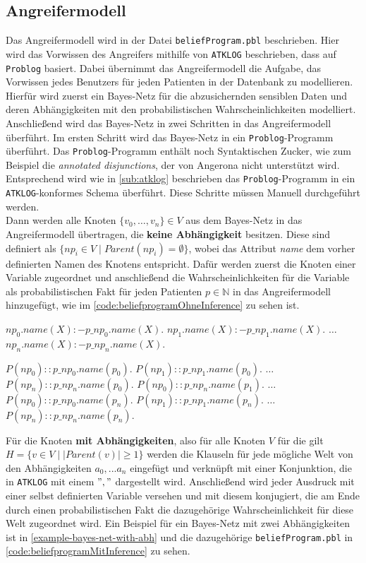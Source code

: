 \documentclass[german,version-2020-11]{uzl-thesis}
\begin{document}
\subsection{Angreifermodell} \label{2.2.1}
Das Angreifermodell wird in der Datei \texttt{beliefProgram.pbl} beschrieben. Hier wird das Vorwissen des Angreifers mithilfe von \texttt{ATKLOG} beschrieben, dass auf \texttt{Problog} basiert. Dabei übernimmt das Angreifermodell die Aufgabe, das Vorwissen jedes Benutzers für jeden Patienten in der Datenbank zu modellieren. \\ 
Hierfür wird zuerst ein Bayes-Netz für die abzusichernden sensiblen Daten und deren Abhängigkeiten mit den probabilistischen Wahrscheinlichkeiten modelliert. Anschließend wird das Bayes-Netz in zwei Schritten in das Angreifermodell überführt. Im ersten Schritt wird das Bayes-Netz in ein \texttt{Problog}-Programm überführt. Das \texttt{Problog}-Programm enthält noch Syntaktischen Zucker, wie zum Beispiel die \emph{annotated disjunctions}, der von Angerona nicht unterstützt wird. Entsprechend wird wie in \cref{sub:atklog} beschrieben das \texttt{Problog}-Programm  in ein \texttt{ATKLOG}-konformes Schema überführt. Diese Schritte müssen Manuell durchgeführt werden. \\   
Dann werden alle Knoten $\{v_0, \dots ,v_n\} \in V$ aus dem Bayes-Netz in das Angreifermodell übertragen, die \textbf{keine Abhängigkeit} besitzen. Diese sind definiert als $\{np_i \in V \mid Parent(np_i) = \emptyset\}$, wobei das Attribut \textit{name} dem vorher definierten Namen des Knotens entspricht. Dafür werden zuerst die Knoten einer Variable zugeordnet und anschließend die Wahrscheinlichkeiten für die Variable als probabilistischen Fakt für jeden Patienten $p \in \mathbb{N}$ in das Angreifermodell hinzugefügt, wie im \autoref{code:beliefprogramOhneInference} zu sehen ist. 
\newpage
\begin{Pseudocode} [caption={\texttt{beliefProgram.pbl} für Knoten ohne Abhängigkeiten}, label={code:beliefprogramOhneInference}, numbers=left]
$np_0.name(X) :- p\_np_0.name(X).$ 
$np_1.name(X) :- p\_np_1.name(X).$ 
$\dots$
$np_n.name(X) :- p\_np_n.name(X).$

$P(np_0) ::  p\_np_0.name(p_0).$ 
$P(np_1) ::  p\_np_1.name(p_0).$ 
$\dots$
$P(np_n) ::  p\_np_n.name(p_0).$ 
$P(np_0) ::  p\_np_n.name(p_1).$ 
$\dots$
$P(np_0) ::  p\_np_0.name(p_n).$ 
$P(np_1) ::  p\_np_1.name(p_n).$ 
$\dots$
$P(np_n) ::  p\_np_n.name(p_n).$ 
\end{Pseudocode}
Für die Knoten \textbf{mit Abhängigkeiten}, also für alle Knoten $V$ für die gilt $H=\{v \in V \mid \lvert Parent(v) \rvert \geq 1 \}$ werden die Klauseln für jede mögliche Welt von den Abhängigkeiten $a_0, ... a_n$ eingefügt und verknüpft mit einer Konjunktion, die in \texttt{ATKLOG} mit einem $","$ dargestellt wird. Anschließend wird jeder Ausdruck mit einer selbst definierten Variable versehen und mit diesem konjugiert, die am Ende durch einen probabilistischen Fakt die dazugehörige Wahrscheinlichkeit für diese Welt zugeordnet wird. Ein Beispiel für ein Bayes-Netz mit zwei Abhängigkeiten ist in \autoref{example-bayes-net-with-abh}  und die dazugehörige \texttt{beliefProgram.pbl} in \autoref{code:beliefprogramMitInference} zu sehen.
\end{document}
